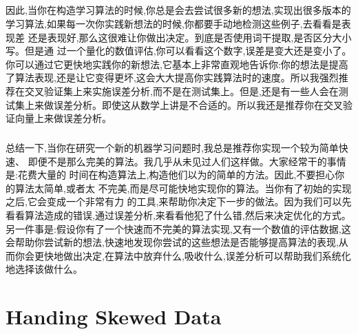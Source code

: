 \documentclass{article}
\begin{document}
\begin{CJK}{UTF8}{gbsn}
\subparagraph{}
因此,当你在构造学习算法的时候,你总是会去尝试很多新的想法,实现出很多版本的学习算法,如果每一次你实践新想法的时候,你都要手动地检测这些例子,去看看是表现差
还是表现好,那么这很难让你做出决定。到底是否使用词干提取,是否区分大小写。但是通
过一个量化的数值评估,你可以看看这个数字,误差是变大还是变小了。你可以通过它更快地实践你的新想法,它基本上非常直观地告诉你:你的想法是提高了算法表现,还是让它变得更坏,这会大大提高你实践算法时的速度。所以我强烈推荐在交叉验证集上来实施误差分析,而不是在测试集上。但是,还是有一些人会在测试集上来做误差分析。即使这从数学上讲是不合适的。所以我还是推荐你在交叉验证向量上来做误差分析。
\begin{figure}[H]
\label{fig:680}
\end{figure}
\subparagraph{}
总结一下,当你在研究一个新的机器学习问题时,我总是推荐你实现一个较为简单快速、
即便不是那么完美的算法。我几乎从未见过人们这样做。大家经常干的事情是:花费大量的
时间在构造算法上,构造他们以为的简单的方法。因此,不要担心你的算法太简单,或者太
不完美,而是尽可能快地实现你的算法。当你有了初始的实现之后,它会变成一个非常有力
的工具,来帮助你决定下一步的做法。因为我们可以先看看算法造成的错误,通过误差分析,来看看他犯了什么错,然后来决定优化的方式。另一件事是:假设你有了一个快速而不完美的算法实现,又有一个数值的评估数据,这会帮助你尝试新的想法,快速地发现你尝试的这些想法是否能够提高算法的表现,从而你会更快地做出决定,在算法中放弃什么,吸收什么,误差分析可以帮助我们系统化地选择该做什么。
\section{Handing Skewed Data}

\end{CJK}
\end{document}

